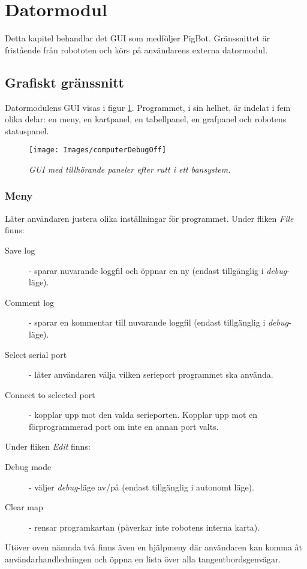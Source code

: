 \documentclass[11pt]{article}
\begin{document}
\section{Datormodul}
Detta kapitel behandlar det GUI som medföljer PigBot. Gränssnittet är fristående från robototen och körs på användarens externa datormodul.

\subsection{Grafiskt gränssnitt}
Datormodulens GUI visas i figur \ref{DebugOff}. Programmet, i sin helhet, är indelat i fem olika delar: en meny, en kartpanel, en tabellpanel, en grafpanel och robotens statuspanel.

\begin{figure}[htbp]
	\centering
	\texttt{[image: Images/computerDebugOff]}
	\caption{\textit{GUI med tillhörande paneler efter rutt i ett bansystem.} \label{DebugOff}}
\end{figure}

\subsubsection{Meny} Låter användaren justera olika inställningar för programmet. Under fliken \emph{File}  finns:
\begin{description}
  \item[Save log] - sparar nuvarande loggfil och öppnar en ny (endast tillgänglig i \textit{debug}-läge).
  \item[Comment log] - sparar en kommentar till nuvarande loggfil (endast tillgänglig i \textit{debug}-läge).
	\item[Select serial port] - låter användaren välja vilken serieport programmet ska använda.
	\item[Connect to selected port] - kopplar upp mot den valda serieporten. Kopplar upp mot en förprogrammerad port om inte en annan port valts. 
\end{description}

Under fliken \emph{Edit} finns:
\begin{description}
  \item[Debug mode] - väljer \textit{debug}-läge av/på (endast tillgänglig i autonomt läge).
	\item [Clear map] - rensar programkartan (påverkar inte robotens interna karta).
\end{description}

Utöver oven nämnda två finns även en hjälpmeny där användaren kan komma åt användarhandledningen och öppna en lista över alla tangentbordsgenvägar.
\end{document}
